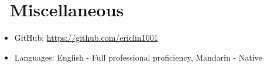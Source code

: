 \documentclass{resume}
\begin{document}
\par
{}


		\section{\faInfo\ Miscellaneous}
		\begin{itemize}[parsep=0.5ex]
			\item GitHub: \url{https://github.com/ericlin1001}
			\item Languages: English - Full professional proficiency, Mandarin - Native
		\end{itemize}

		
\end{document}
